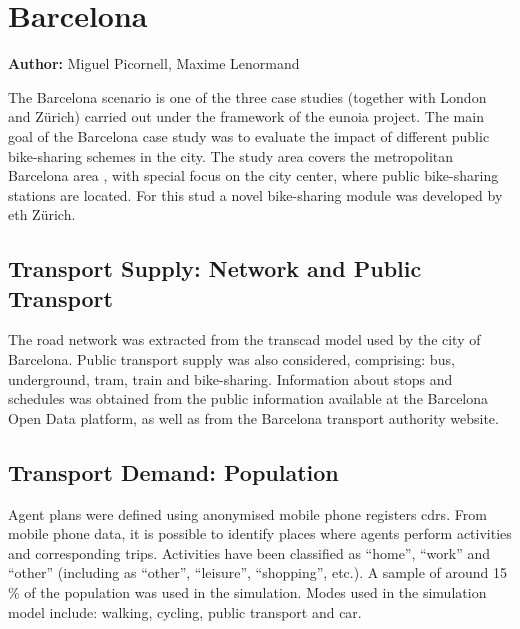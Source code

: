 \chapter{Barcelona}
\label{ch:barcelona}
\hfill \textbf{Author:} Miguel Picornell, Maxime Lenormand


The Barcelona scenario is one of the three case studies (together with London and Zürich) carried out under the framework of the \gls{eunoia} project. The main goal of the Barcelona case study was to evaluate the impact of different public bike-sharing schemes in the city. The study area covers the metropolitan Barcelona area , with special focus on the city center, where public bike-sharing stations are located. For this stud a novel bike-sharing module was developed by \gls{eth} Zürich.

\section{Transport Supply: Network and Public Transport}
The road network was extracted from the \gls{transcad} model used by the city of Barcelona. Public transport supply was also considered, comprising: bus, underground, tram, train and bike-sharing. Information about stops and schedules was obtained from the public information available at the Barcelona Open Data platform, as well as from the Barcelona transport authority website. 

\section{Transport Demand: Population} 
Agent plans were defined using anonymised mobile phone registers \glspl{cdr}. From mobile phone data, it is possible to identify places where agents perform activities and corresponding trips. Activities have been classified as ``home'', ``work'' and ``other'' (including as ``other'', ``leisure'', ``shopping'', etc.). A sample of around 15\,\% of the population was used in the simulation. Modes used  in the simulation model include: walking, cycling, public transport and car.

